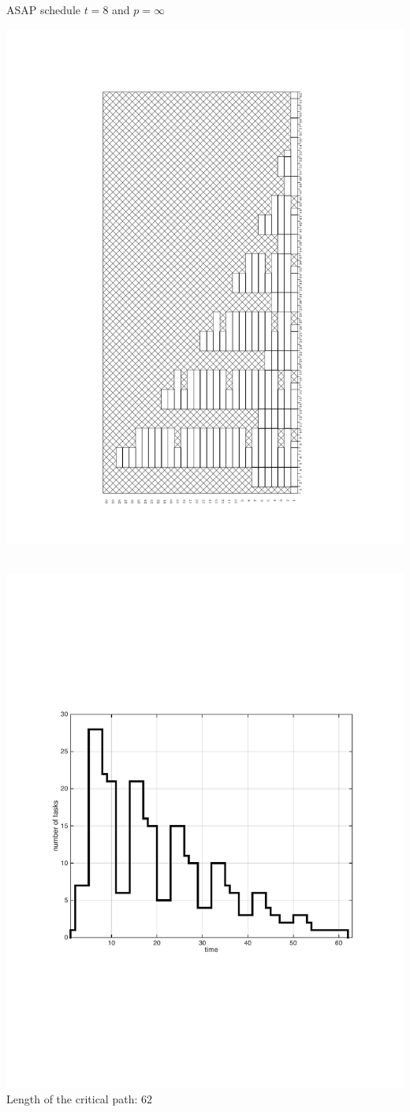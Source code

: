 \begin{frame}
ASAP schedule $t=8$ and $p=\infty$\\

  {\begin{minipage}{.25\textwidth}\vspace*{-2.8cm}
  \includegraphics[width=\textwidth,angle=270]{./fig/t8_p30_fwd.pdf}\end{minipage}}
  ~~~~~~~~~~~~~~~~~~~~~~~~~~~~~~~~~\includegraphics[width=.35\textwidth]{matlab_files/qqq_t8__asap.pdf}\\

Length of the critical path: $62$

\end{frame}




